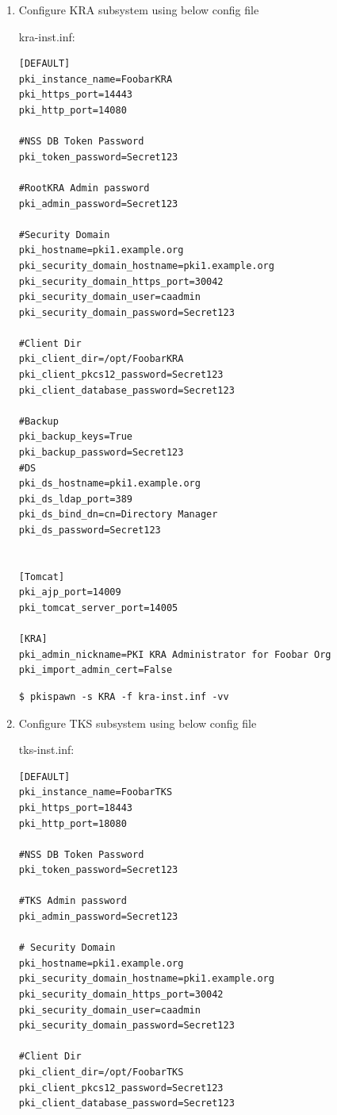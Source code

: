\documentclass[12pt]{report}
\begin{document}
\begin{enumerate}[label*=\arabic*.]
\begin{enumerate}[label*=\arabic*.]
            \item Configure KRA subsystem using below config file 

                kra-inst.inf:
                \begin{lstlisting}[style=configFile]
[DEFAULT]
pki_instance_name=FoobarKRA
pki_https_port=14443
pki_http_port=14080

#NSS DB Token Password
pki_token_password=Secret123

#RootKRA Admin password
pki_admin_password=Secret123

#Security Domain
pki_hostname=pki1.example.org
pki_security_domain_hostname=pki1.example.org
pki_security_domain_https_port=30042
pki_security_domain_user=caadmin
pki_security_domain_password=Secret123

#Client Dir
pki_client_dir=/opt/FoobarKRA
pki_client_pkcs12_password=Secret123
pki_client_database_password=Secret123

#Backup
pki_backup_keys=True
pki_backup_password=Secret123
#DS
pki_ds_hostname=pki1.example.org
pki_ds_ldap_port=389
pki_ds_bind_dn=cn=Directory Manager
pki_ds_password=Secret123


[Tomcat]
pki_ajp_port=14009
pki_tomcat_server_port=14005

[KRA]
pki_admin_nickname=PKI KRA Administrator for Foobar Org
pki_import_admin_cert=False
                \end{lstlisting}
                \begin{lstlisting}[style=bashInputStyle]
$ pkispawn -s KRA -f kra-inst.inf -vv 
                \end{lstlisting}
            
            \item Configure TKS subsystem using below config file 

            tks-inst.inf:
            \begin{lstlisting}[style=configFile]
[DEFAULT]
pki_instance_name=FoobarTKS
pki_https_port=18443
pki_http_port=18080

#NSS DB Token Password
pki_token_password=Secret123

#TKS Admin password
pki_admin_password=Secret123

# Security Domain
pki_hostname=pki1.example.org
pki_security_domain_hostname=pki1.example.org
pki_security_domain_https_port=30042
pki_security_domain_user=caadmin
pki_security_domain_password=Secret123

#Client Dir
pki_client_dir=/opt/FoobarTKS
pki_client_pkcs12_password=Secret123
pki_client_database_password=Secret123


\end{lstlisting}
\end{enumerate}
\end{enumerate}
\end{document}
